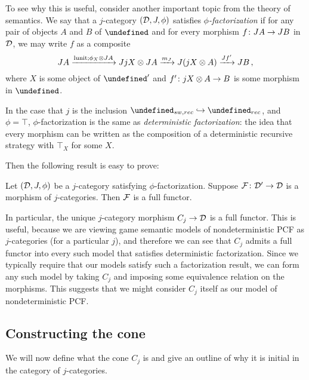 \documentclass[sigplan,10pt,review]{acmart}\settopmatter{printfolios=true,printccs=false,printacmref=false}
\let\G\undefined
\let\C\undefined
\begin{document}
To see why this is useful, consider another important topic from the theory of semantics.  
We say that a $j$-category $({\mathcal{D}},J,\phi)$ satisfies \emph{$\phi$-factorization} if for any pair of objects $A$ and $B$ of $\C$ and for every morphism $f\colon JA \to JB$ in ${\mathcal{D}}$, we may write $f$ as a composite
\[
  JA \xrightarrow{\operatorname{lunit};\phi_X\otimes JA}
  Jj X \otimes JA \xrightarrow{m_J}
  J (jX \otimes A) \xrightarrow{J f'}
  JB\,,
  \]
where $X$ is some object of $\C'$ and $f'\colon jX \otimes A\to B$ is some morphism in $\C$.
\begin{example}
  In the case that $j$ is the inclusion $\G_{sw,rec}\hookrightarrow\G_{rec}$, and $\phi=\top$, $\phi$-factorization is the same as \emph{deterministic factorization}: the idea that every morphism can be written as the composition of a deterministic recursive strategy with $\top_X$ for some $X$.
\end{example}

Then the following result is easy to prove:
\begin{proposition}
  Let $({\mathcal{D}},J,\phi)$ be a $j$-category satisfying $\phi$-factorization.  
  Suppose $\mathcal F\colon{\mathcal{D}}'\to{\mathcal{D}}$ is a morphism of $j$-categories.  
  Then $\mathcal F$ is a full functor.
\end{proposition}
In particular, the unique $j$-category morphism $C_j\to{\mathcal{D}}$ is a full functor.  
This is useful, because we are viewing game semantic models of nondeterministic PCF as $j$-categories (for a particular $j$), and therefore we can see that $C_j$ admits a full functor into every such model that satisfies deterministic factorization.  
Since we typically require that our models satisfy such a factorization result, we can form any such model by taking $C_j$ and imposing some equivalence relation on the morphisms.  
This suggests that we might consider $C_j$ itself as our model of nondeterministic PCF.

\subsection{Constructing the cone}

We will now define what the cone $C_j$ is and give an outline of why it is initial in the category of $j$-categories.
\end{document}
